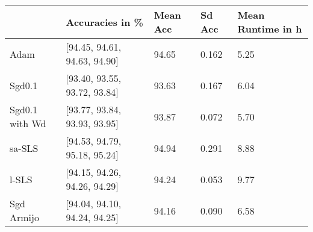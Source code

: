 \begin{tabular}{lllll}
\toprule
{} &               Accuracies in \% & Mean Acc & Sd Acc & Mean Runtime in h \\
\midrule
Adam           &  [94.45, 94.61, 94.63, 94.90] &    94.65 &  0.162 &              5.25 \\
Sgd0.1         &  [93.40, 93.55, 93.72, 93.84] &    93.63 &  0.167 &              6.04 \\
Sgd0.1 with Wd &  [93.77, 93.84, 93.93, 93.95] &    93.87 &  0.072 &              5.70 \\
sa-SLS         &  [94.53, 94.79, 95.18, 95.24] &    94.94 &  0.291 &              8.88 \\
l-SLS          &  [94.15, 94.26, 94.26, 94.29] &    94.24 &  0.053 &              9.77 \\
Sgd Armijo     &  [94.04, 94.10, 94.24, 94.25] &    94.16 &  0.090 &              6.58 \\
\bottomrule
\end{tabular}
